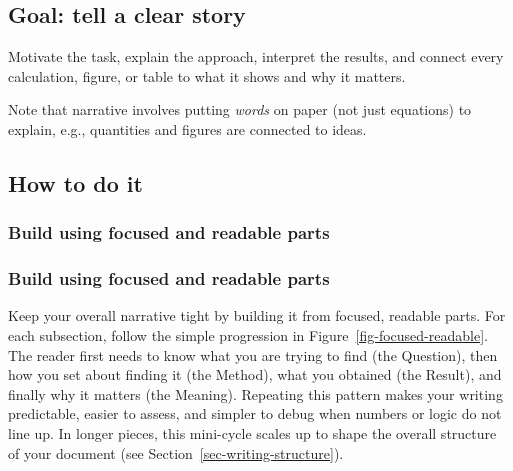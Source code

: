\documentclass[
  a4paper,
  DIV=11,
  numbers=noendperiod,
  oneside]{scrreprt}
\begin{document}
\subsection{Goal: tell a clear story}\label{goal-tell-a-clear-story}

Motivate the task, explain the approach, interpret the results, and
connect every calculation, figure, or table to what it shows and why it
matters.

\begin{tcolorbox}[enhanced jigsaw, opacitybacktitle=0.6, colframe=quarto-callout-important-color-frame, bottomrule=.15mm, coltitle=black, colback=white, title=\textcolor{quarto-callout-important-color}{\faExclamation}\hspace{0.5em}{Narrative implies writing}, breakable, toptitle=1mm, arc=.35mm, left=2mm, opacityback=0, rightrule=.15mm, bottomtitle=1mm, colbacktitle=quarto-callout-important-color!10!white, toprule=.15mm, leftrule=.75mm, titlerule=0mm]

Note that narrative involves putting \emph{words} on paper (not just
equations) to explain, e.g., quantities and figures are connected to
ideas.

\end{tcolorbox}

\subsection{How to do it}\label{how-to-do-it}

\subsubsection{Build using focused and readable
parts}\label{build-using-focused-and-readable-parts}

\subsubsection{Build using focused and readable
parts}\label{build-using-focused-and-readable-parts-1}

Keep your overall narrative tight by building it from focused, readable
parts. For each subsection, follow the simple progression in
Figure~\ref{fig-focused-readable}. The reader first needs to know what
you are trying to find (the Question), then how you set about finding it
(the Method), what you obtained (the Result), and finally why it matters
(the Meaning). Repeating this pattern makes your writing predictable,
easier to assess, and simpler to debug when numbers or logic do not line
up. In longer pieces, this mini-cycle scales up to shape the overall
structure of your document (see Section~\ref{sec-writing-structure}).
\end{document}
